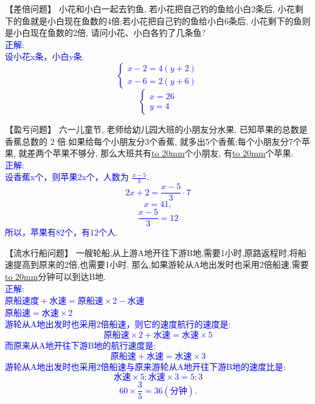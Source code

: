\item {
    【差倍问题】
    小花和小白一起去钓鱼, 若小花把自己钓的鱼给小白2条后, 小花剩下的鱼就是小白现在鱼数的4倍;若小花把自己钓的鱼给小白6条后, 小花剩下的鱼则是小白现在鱼数的2倍, 请问小花、小白各钓了几条鱼?
    \ifshowSolution{}
        \fangsong{}\textcolor{blue}{
            \\正解:\\
            设小花x条，小白y条.\\
                \[\left\{\begin{array}{l}
                    x-2 = 4(y+2) \\
                    x-6 = 2(y+6)  
                \end{array}\right.\]
                \[\left\{\begin{array}{l}
                    x = 26 \\
                    y = 4 
                \end{array}\right.\]
        }
    \else
        \vspace{2cm}
    \fi
}

\item {
    【盈亏问题】
    六一儿童节, 老师给幼儿园大班的小朋友分水果, 已知苹果的总数是香蕉总数的 2 倍.如果给每个小朋友分3个香蕉, 就多出5个香蕉;每个小朋友分7个苹果, 就差两个苹果不够分, 那么大班共有\underline{\hbox to 20mm{}}个小朋友, 有\underline{\hbox to 20mm{}}个苹果.
    \ifshowSolution{}
        \fangsong{}\textcolor{blue}{
            \\正解:\\
            设香蕉x个，则苹果2x个，人数为 $\frac{x-5}{3}$.\\
            \[
                2x + 2 = \frac{x-5}{3}\cdot 7
            \]
            \[
                x = 41, 
            \]
            \[
                \frac{x-5}{3} = 12
            \]
            所以，苹果有82个，有12个人.
        }
    \else
        \vspace{2cm}
    \fi
}

\item {
    【流水行船问题】
    一艘轮船,从上游A地开往下游B地,需要1小时,原路返程时,将船速提高到原来的2倍,也需要1小时. 那么,如果游轮从A地出发时也采用2倍船速,需要\underline{\hbox to 20mm{}}分钟可以到达B地.
    \ifshowSolution{}
        \fangsong{}\textcolor{blue}{
            \\正解:\\
            $原船速度+水速 = 原船速\times 2 - 水速$\\
            $原船速=水速\times 2$\\
            游轮从A地出发时也采用2倍船速，则它的速度航行的速度是:
            \[原船速\times 2 + 水速 = 水速\times 5\]
            而原来从A地开往下游B地的航行速度是:
            \[原船速+水速 = 水速\times 3\]
            游轮从A地出发时也采用2倍船速与原来游轮从A地开往下游B地的速度比是:
            \[水速\times 5 : 水速\times 3 = 5:3\]
            \[60\times \frac35 = 36(分钟). \]
        }
    \else
        \vspace{2cm}
    \fi
}

